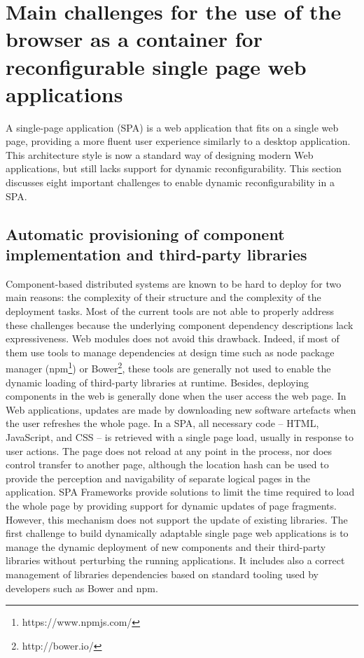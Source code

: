 \section{Main challenges for the use of the browser as a container for reconfigurable single page web applications }
A single-page application (SPA) is a web application that fits on a single web page, providing a more fluent user experience similarly to a desktop application.
This architecture style is now a standard way of designing modern Web applications, but still lacks support for dynamic reconfigurability.
This section discusses eight important challenges to  enable dynamic reconfigurability in a SPA.

\subsection{Automatic provisioning of component implementation and third-party libraries}

Component-based distributed systems are known to be hard to deploy for two main reasons: the complexity of their structure and the complexity of the deployment tasks. Most of the current tools are not able to properly address these challenges because the underlying component dependency descriptions lack expressiveness. Web modules does not avoid this drawback. Indeed, if most of them use tools to manage dependencies at design time such as node package manager (npm\footnote{https://www.npmjs.com/}) or Bower\footnote{http://bower.io/}, these tools are generally not used to enable the dynamic loading of third-party libraries at runtime. Besides, deploying components in the web is generally done when the user access the web page. In Web applications, updates are made by downloading new software artefacts when the user refreshes the whole page. In a SPA, all necessary code -- HTML, JavaScript, and CSS -- is retrieved with a single page load, usually in response to user actions. The page does not reload at any point in the process, nor does control transfer to another page, although the location hash can be used to provide the perception and navigability of separate logical pages in the application. SPA Frameworks provide solutions to limit the time required to load the whole page by providing support for dynamic updates of page fragments. However, this mechanism does not support the update of existing libraries. The first challenge to build dynamically adaptable single page web applications is to manage the dynamic deployment of new components and their third-party libraries without perturbing the running applications. It includes also a correct management of libraries dependencies based on standard tooling used by developers such as Bower and npm.

